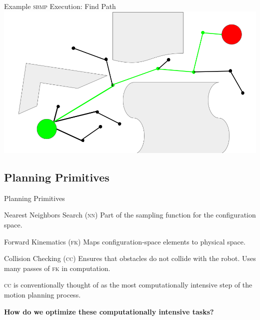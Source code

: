 \documentclass{beamer}
\begin{document}
\begin{frame}{Example \textsc{sbmp} Execution: Find Path}
\includegraphics[width=\textwidth]{./assets/rrt_slides/rrt_slides_8.png}
\end{frame}

\subsection{Planning Primitives}

\begin{frame}[label=p_primitives]{Planning Primitives}
\pause
\begin{block}{Nearest Neighbors Search (\textsc{nn})}
Part of the sampling function for the configuration space.
\end{block}

\begin{block}{Forward Kinematics (\textsc{fk})}
Maps configuration-space elements to physical space.
\end{block}

\begin{block}{Collision Checking (\textsc{cc})}
Ensures that obstacles do not collide with the robot. Uses many passes of \textsc{fk} in computation. 
\end{block}

\textsc{cc} is conventionally thought of as the most computationally intensive step of the motion planning process. \cite{paper:rrt90}%

\end{frame}

\begin{frame}
\centering
\textbf{How do we optimize these computationally intensive tasks?}
\end{frame}
\end{document}

